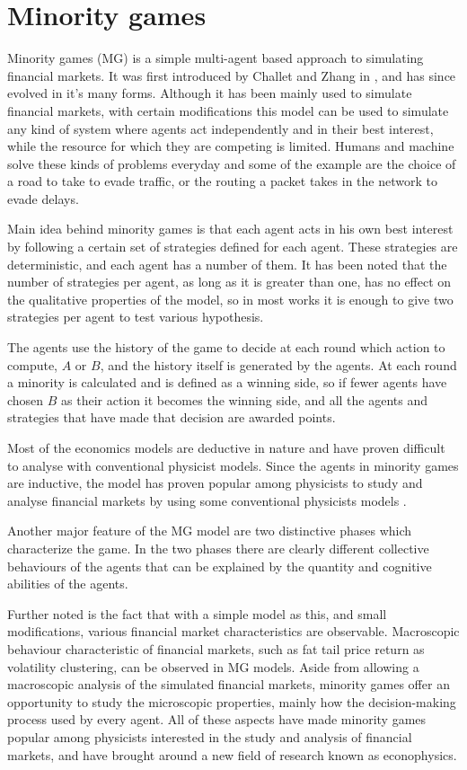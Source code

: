 \chapter{Minority games}
\label{chapter:minority}

Minority games (MG) is a simple multi-agent based approach to simulating financial markets. 
It was first introduced by Challet and Zhang in \cite{challet1997emergence}, and has since evolved in it's many forms.
Although it has been mainly used to simulate financial markets, with certain modifications this model can be used to simulate any kind of system where agents act independently and in their best interest, while the resource for which they are competing is limited.
Humans and machine solve these kinds of problems everyday and some of the example are the choice of a road to take to evade traffic, or the routing a packet takes in the network to evade delays.

Main idea behind minority games is that each agent acts in his own best interest by following a certain set of strategies defined for each agent.
These strategies are deterministic, and each agent has a number of them.
It has been noted that the number of strategies per agent, as long as it is greater than one, has no effect on the qualitative properties of the model, so in most works it is enough to give two strategies per agent to test various hypothesis.

The agents use the history of the game to decide at each round which action to compute, $A$ or $B$, and the history itself is generated by the agents.
At each round a minority is calculated and is defined as a winning side, so if fewer agents have chosen $B$ as their action it becomes the winning side, and all the agents and strategies that have made that decision are awarded points.

Most of the economics models are deductive in nature and have proven difficult to analyse with conventional physicist models.
Since the agents in minority games are inductive, the model has proven popular among physicists to study and analyse financial markets by using some conventional physicists models \cite{yeung2009minority}.

Another major feature of the MG model are two distinctive phases which characterize the game.
In the two phases there are clearly different collective behaviours of the agents that can be explained by the quantity and cognitive abilities of the agents.

Further noted is the fact that with a simple model as this, and small modifications, various financial market characteristics are observable.
Macroscopic behaviour characteristic of financial markets, such as fat tail price return as volatility clustering, can be observed in MG models.
Aside from allowing a macroscopic analysis of the simulated financial markets, minority games offer an opportunity to study the microscopic properties, mainly how the decision-making process used by every agent. 
All of these aspects have made minority games popular among physicists interested in the study and analysis of financial markets, and have brought around a new field of research known as econophysics.

